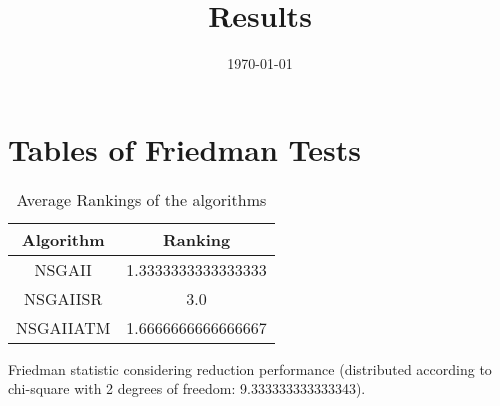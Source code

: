 \documentclass{article}
\title{Results}
\author{}
\date{\today}
\begin{document}
\oddsidemargin 0in \topmargin 0in\maketitle
\section{Tables of Friedman Tests}
\begin{table}[!htp]
\centering
\caption{Average Rankings of the algorithms
}\begin{tabular}{c|c}
Algorithm&Ranking\\
\hline
NSGAII&1.3333333333333333\\
NSGAIISR&3.0\\
NSGAIIATM&1.6666666666666667\\
\end{tabular}
\end{table}


Friedman statistic considering reduction performance (distributed according to chi-square with 2 degrees of freedom: 9.333333333333343).
\end{document}
